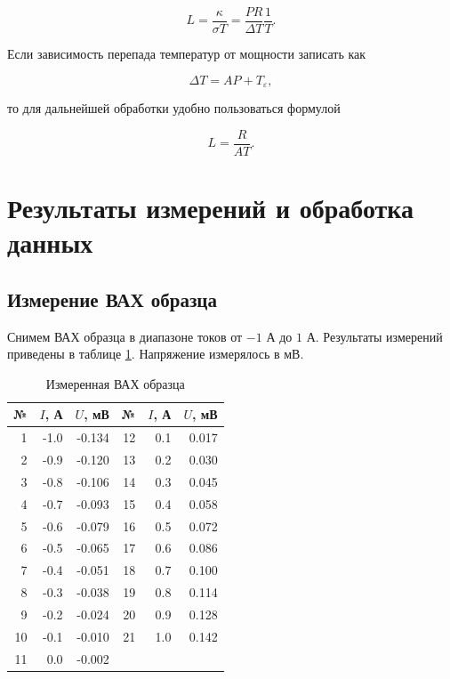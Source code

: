 \documentclass[a4paper,12pt]{article}
\begin{document}
\begin{equation}
    L = \frac{\kappa}{\sigma T} =
    \frac{PR}{\Delta T}\frac{1}{T}.
\end{equation}

Если зависимость перепада температур от мощности записать как

\begin{equation}
    \Delta T = A P + T_{\varepsilon},
    \label{eq:deltaT-P}
\end{equation}

то для дальнейшей обработки удобно пользоваться формулой

\begin{equation}
    L = \frac{R}{AT}.
    \label{eq:L}
\end{equation}

\section{Результаты измерений и обработка данных}

\subsection*{Измерение ВАХ образца}

Снимем ВАХ образца в диапазоне токов от $-1$ А до $1$ А. Результаты измерений приведены в таблице \ref{tab:vah}. Напряжение измерялось в мВ.

\begin{table}[h]
    \centering
    \small
    \caption{Измеренная ВАХ образца}
    \label{tab:vah}
    \begin{tabular}{|r|r|r||r|r|r|}
        \hline
        № & $I$, А & $U$, мВ & № & $I$, А & $U$, мВ \\
        \hline
         1 & -1.0 & -0.134 & 12 &  0.1 &  0.017 \\
         2 & -0.9 & -0.120 & 13 &  0.2 &  0.030 \\
         3 & -0.8 & -0.106 & 14 &  0.3 &  0.045 \\
         4 & -0.7 & -0.093 & 15 &  0.4 &  0.058 \\
         5 & -0.6 & -0.079 & 16 &  0.5 &  0.072 \\
         6 & -0.5 & -0.065 & 17 &  0.6 &  0.086 \\
         7 & -0.4 & -0.051 & 18 &  0.7 &  0.100 \\
         8 & -0.3 & -0.038 & 19 &  0.8 &  0.114 \\
         9 & -0.2 & -0.024 & 20 &  0.9 &  0.128 \\
        10 & -0.1 & -0.010 & 21 &  1.0 &  0.142 \\
        11 &  0.0 & -0.002 &    &      &        \\
        \hline
    \end{tabular}
\end{table}
\end{document}
